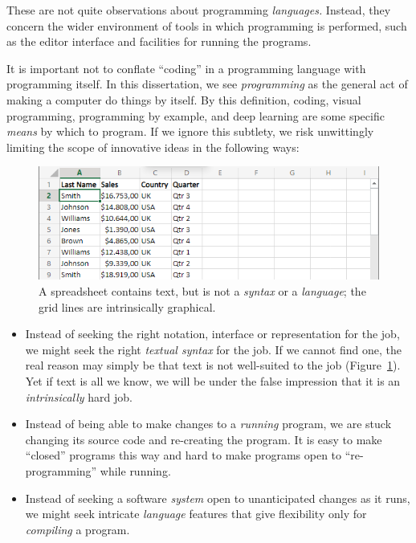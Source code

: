 \documentclass[ twoside,openright,titlepage,numbers=noenddot,headinclude,footinclude,cleardoublepage=empty,abstract=on,
                BCOR=5mm,paper=a4,fontsize=11pt
                ]{scrreprt}
\providecommand{\tightlist}{}\newenvironment{longtable}[2]{\begin{tabular}}{\end{tabular}}
\theoremstyle{definition}
\begin{document}
These are not quite observations about programming \emph{languages.}
Instead, they concern the wider environment of tools in which
programming is performed, such as the editor interface and facilities
for running the programs.

It is important not to conflate ``coding'' in a programming language
with programming itself. In this dissertation, we see \emph{programming}
as the general act of making a computer do things by itself. By this
definition, coding, visual programming, programming by example, and deep
learning are some specific \emph{means} by which to program. If we
ignore this subtlety, we risk unwittingly limiting the scope of
innovative ideas in the following ways:

\begin{figure}
\centering
\includegraphics[width=\linewidth]{spreadsheet.png}
\caption[Spreadsheet interface]{A spreadsheet contains text, but is not a \emph{syntax} or a \emph{language}; the grid lines are intrinsically graphical.}
\label{fig:spreadsheet}
\end{figure}

\begin{itemize}
\tightlist
\item
  Instead of seeking the right notation, interface or representation for
  the job, we might seek the right \emph{textual syntax} for the job. If
  we cannot find one, the real reason may simply be that text is not
  well-suited to the job (Figure~\ref{fig:spreadsheet}). Yet if text is
  all we know, we will be under the false impression that it is an
  \emph{intrinsically} hard job.
\item
  Instead of being able to make changes to a \emph{running} program, we
  are stuck changing its source code and re-creating the program. It is
  easy to make ``closed'' programs this way and hard to make programs
  open to ``re-programming'' while running.
\item
  Instead of seeking a software \emph{system} open to unanticipated
  changes as it runs, we might seek intricate \emph{language} features
  that give flexibility only for \emph{compiling} a program.
\end{itemize}
\end{document}
